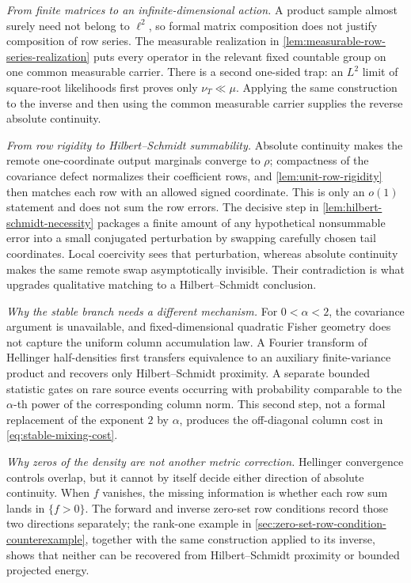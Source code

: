 \emph{From finite matrices to an infinite-dimensional action.}
A product sample almost surely need not belong to \(\ell^2\), so formal matrix
composition does not justify composition of row series.  The measurable
realization in \cref{lem:measurable-row-series-realization} puts every operator
in the relevant fixed countable group on one common measurable carrier.  There
is a second one-sided trap: an \(L^2\) limit of square-root likelihoods first proves only
\(\nu_T\ll\mu\).  Applying the same construction to the inverse and then using
the common measurable carrier supplies the reverse absolute continuity.

\emph{From row rigidity to Hilbert--Schmidt summability.}
Absolute continuity makes the remote one-coordinate output marginals converge
to \(\rho\); compactness of the covariance defect normalizes their coefficient
rows, and \cref{lem:unit-row-rigidity} then matches each row with an allowed
signed coordinate.  This is only an \(o(1)\) statement and does not sum the row errors.
The decisive step in \cref{lem:hilbert-schmidt-necessity} packages a finite
amount of any hypothetical nonsummable error into a small conjugated
perturbation by swapping carefully chosen tail coordinates.  Local coercivity
sees that perturbation, whereas absolute continuity makes the same remote swap
asymptotically invisible.  Their contradiction is what upgrades qualitative
matching to a Hilbert--Schmidt conclusion.

\emph{Why the stable branch needs a different mechanism.}
For \(0<\alpha<2\), the covariance argument is unavailable, and
fixed-dimensional quadratic Fisher geometry does not capture the uniform
column accumulation law.  A Fourier transform of Hellinger
half-densities first transfers equivalence to an auxiliary finite-variance
product and recovers only Hilbert--Schmidt proximity.  A separate bounded
statistic gates on rare source events occurring with probability comparable to
the \(\alpha\)-th power of the corresponding column norm.  This second step, not a formal
replacement of the exponent \(2\) by \(\alpha\), produces the off-diagonal
column cost in \eqref{eq:stable-mixing-cost}.

\emph{Why zeros of the density are not another metric correction.}
Hellinger convergence controls overlap, but it cannot by itself decide either
direction of absolute continuity.  When \(f\) vanishes, the missing information
is whether each row sum lands in \(\{f>0\}\).  The forward and inverse zero-set
row conditions record those two directions separately; the rank-one example
in \cref{sec:zero-set-row-condition-counterexample}, together with the same
construction applied to its inverse, shows that neither can be recovered from
Hilbert--Schmidt proximity or bounded projected energy.

